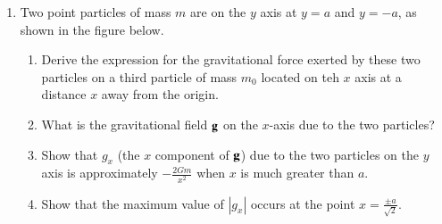 \documentclass{../../../oss-apphys}
\begin{document}
\begin{enumerate}[leftmargin=15pt]
\item Two point particles of mass $m$ are on the $y$ axis at $y=a$ and $y=-a$,
  as shown in the figure below.
  \begin{center}
  \end{center}
  \begin{enumerate}[noitemsep,leftmargin=20pt]
  \item Derive the expression for the gravitational force exerted by these two
    particles on a third particle of mass $m_0$ located on teh $x$ axis at a
    distance $x$ away from the origin.
  \item What is the gravitational field $\mathbf{g}$ on the $x$-axis due to the
    two particles?
  \item Show that $g_x$ (the $x$ component of $\mathbf{g}$) due to the two
    particles on the $y$ axis is approximately $\displaystyle-\frac{2Gm}{x^2}$
    when $x$ is much greater than $a$.
  \item Show that the maximum value of $|g_x|$ occurs at the point
    $\displaystyle x=\frac{\pm a}{\sqrt{2}}$.
  \end{enumerate}
  \newpage


\end{enumerate}
\end{document}

